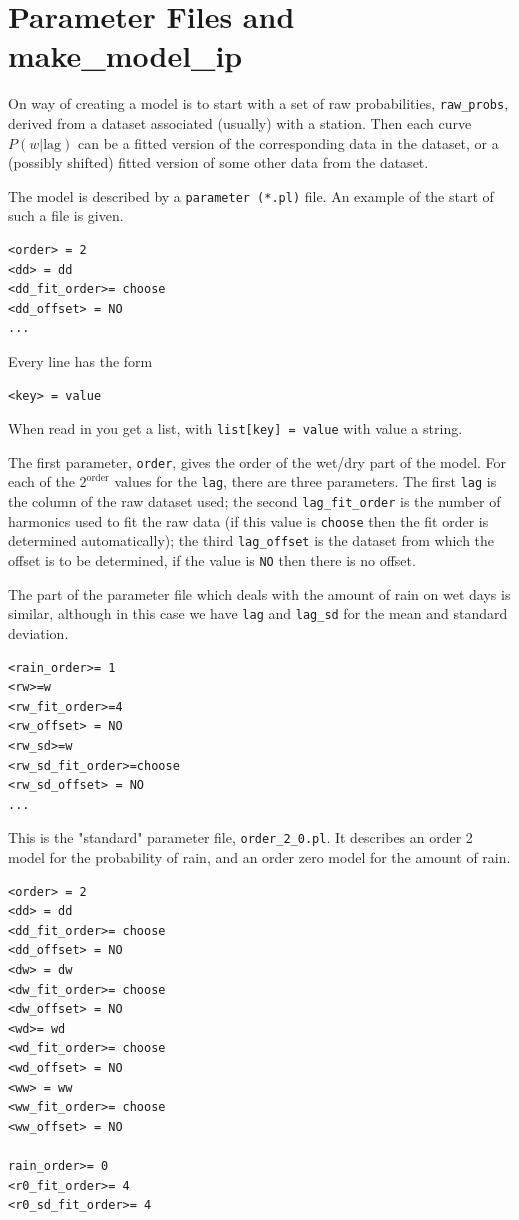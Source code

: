 \documentclass{article}
\begin{document}
\section{Parameter Files and make\_model\_ip}

On way of creating a model is to start with a set of raw probabilities,
{\tt raw\_probs}, derived from a dataset associated (usually) with a station.
Then each curve $P(w|\mbox{lag})$ can be a fitted version of the corresponding
data in the dataset, or a (possibly shifted) fitted version of some other
data from the dataset.

The model is described by a {\tt parameter (*.pl)} file.
An example of the start of such a file is given.

\begin{verbatim}
<order> = 2
<dd> = dd  
<dd_fit_order>= choose
<dd_offset> = NO
...
\end{verbatim}

Every line has the form
\begin{verbatim}
<key> = value
\end{verbatim}
When read in you get a list, with {\tt list[key] = value}
with value a string.

The first parameter, {\tt order}, gives the order of the wet/dry part
of the model.  For each of the $2^{\mbox{order}}$ values for the {\tt lag},
there are three parameters.   The first {\tt lag} is the column
of the raw dataset used; the second {\tt lag\_fit\_order} is the number
of harmonics used to fit the raw data (if this value is {\tt choose} then the fit
order is determined automatically); the third {\tt lag\_offset}
is the dataset from which the offset is to be determined, if the
value is {\tt NO} then there is no offset.

The part of the parameter file which deals with the amount of rain on wet
days is similar,  although in this case we have {\tt lag} and {\tt lag\_sd}
for the mean and standard deviation.

\begin{verbatim}
<rain_order>= 1
<rw>=w
<rw_fit_order>=4
<rw_offset> = NO
<rw_sd>=w
<rw_sd_fit_order>=choose
<rw_sd_offset> = NO
...
\end{verbatim}

This is the "standard" parameter file, {\tt order\_2\_0.pl}.   It describes an order 2
model for the probability of rain, and an order zero model for the
amount of rain.

\begin{verbatim}
<order> = 2
<dd> = dd  
<dd_fit_order>= choose
<dd_offset> = NO
<dw> = dw
<dw_fit_order>= choose
<dw_offset> = NO
<wd>= wd
<wd_fit_order>= choose
<wd_offset> = NO
<ww> = ww
<ww_fit_order>= choose
<ww_offset> = NO

rain_order>= 0
<r0_fit_order>= 4
<r0_sd_fit_order>= 4

\end{verbatim}
\end{document}
